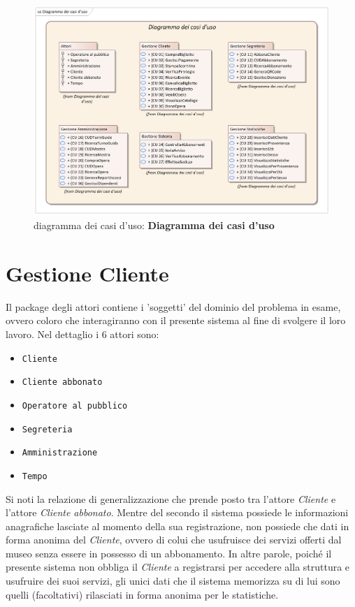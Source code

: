 \documentclass{article}
\begin{document}
\begin{figure}[h]
    \centering
    \includegraphics[width=1\textwidth]{Diagramma dei casi d'uso}
    \caption{diagramma dei casi d'uso: \textbf{Diagramma dei casi d'uso}}
    \label{fig:Diagramma dei casi d'uso}
\end{figure}



\newpage

\section{Gestione Cliente}

\indent\indent Il package degli attori contiene i 'soggetti' del dominio del problema in esame, ovvero coloro che interagiranno con il presente sistema al fine di svolgere il loro lavoro. Nel dettaglio i 6 attori sono:

\medskip
\begin{itemize}[itemsep=0pt]
  \item \texttt{Cliente}
  \item \texttt{Cliente abbonato}
  \item \texttt{Operatore al pubblico}
  \item \texttt{Segreteria}
  \item \texttt{Amministrazione}
  \item \texttt{Tempo}
\end{itemize}

\medskip
Si noti la relazione di generalizzazione che prende posto tra l'attore \emph{Cliente} e l'attore \emph{Cliente abbonato}. Mentre del secondo il sistema possiede le informazioni anagrafiche lasciate al momento della sua registrazione, non possiede che dati in forma anonima del \emph{Cliente}, ovvero di colui che usufruisce dei servizi offerti dal museo senza essere in possesso di un abbonamento. In altre parole, poiché il presente sistema non obbliga il \emph{Cliente} a registrarsi per accedere alla struttura e usufruire dei suoi servizi, gli unici dati che il sistema memorizza su di lui sono quelli (facoltativi) rilasciati in forma anonima per le statistiche.
\end{document}

